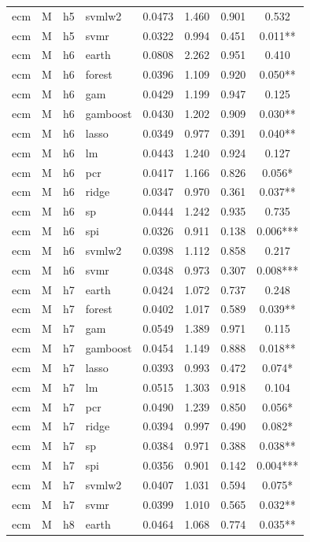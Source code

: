 \begin{ThreePartTable}
\begin{longtable}[t]{llclcccc}
ecm & M & h5 & svmlw2 & 0.0473 & 1.460 & 0.901 & 0.532\\
ecm & M & h5 & svmr & 0.0322 & 0.994 & 0.451 & 0.011**\\
\addlinespace
ecm & M & h6 & earth & 0.0808 & 2.262 & 0.951 & 0.410\\
ecm & M & h6 & forest & 0.0396 & 1.109 & 0.920 & 0.050**\\
ecm & M & h6 & gam & 0.0429 & 1.199 & 0.947 & 0.125\\
ecm & M & h6 & gamboost & 0.0430 & 1.202 & 0.909 & 0.030**\\
ecm & M & h6 & lasso & 0.0349 & 0.977 & 0.391 & 0.040**\\
ecm & M & h6 & lm & 0.0443 & 1.240 & 0.924 & 0.127\\
ecm & M & h6 & pcr & 0.0417 & 1.166 & 0.826 & 0.056*\\
ecm & M & h6 & ridge & 0.0347 & 0.970 & 0.361 & 0.037**\\
ecm & M & h6 & sp & 0.0444 & 1.242 & 0.935 & 0.735\\
ecm & M & h6 & spi & 0.0326 & 0.911 & 0.138 & 0.006***\\
ecm & M & h6 & svmlw2 & 0.0398 & 1.112 & 0.858 & 0.217\\
ecm & M & h6 & svmr & 0.0348 & 0.973 & 0.307 & 0.008***\\
\addlinespace
ecm & M & h7 & earth & 0.0424 & 1.072 & 0.737 & 0.248\\
ecm & M & h7 & forest & 0.0402 & 1.017 & 0.589 & 0.039**\\
ecm & M & h7 & gam & 0.0549 & 1.389 & 0.971 & 0.115\\
ecm & M & h7 & gamboost & 0.0454 & 1.149 & 0.888 & 0.018**\\
ecm & M & h7 & lasso & 0.0393 & 0.993 & 0.472 & 0.074*\\
ecm & M & h7 & lm & 0.0515 & 1.303 & 0.918 & 0.104\\
ecm & M & h7 & pcr & 0.0490 & 1.239 & 0.850 & 0.056*\\
ecm & M & h7 & ridge & 0.0394 & 0.997 & 0.490 & 0.082*\\
ecm & M & h7 & sp & 0.0384 & 0.971 & 0.388 & 0.038**\\
ecm & M & h7 & spi & 0.0356 & 0.901 & 0.142 & 0.004***\\
ecm & M & h7 & svmlw2 & 0.0407 & 1.031 & 0.594 & 0.075*\\
ecm & M & h7 & svmr & 0.0399 & 1.010 & 0.565 & 0.032**\\
\addlinespace
ecm & M & h8 & earth & 0.0464 & 1.068 & 0.774 & 0.035**\\

\end{longtable}
\end{ThreePartTable}
